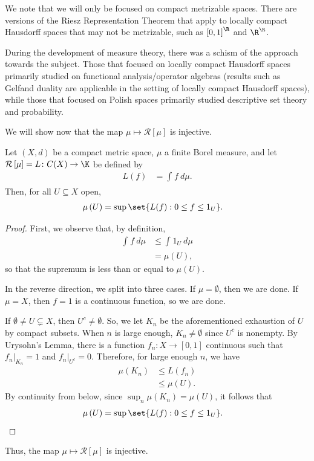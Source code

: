 \documentclass[10pt]{mypackage}
\begin{document}
We note that we will only be focused on compact metrizable spaces. There are versions of the Riesz Representation Theorem that apply to locally compact Hausdorff spaces that may not be metrizable, such as $\left[ 0,1 \right]^{\R}$ and $\R^{\R}$.
\begin{remark}
 During the development of measure theory, there was a schism of the approach towards the subject. Those that focused on locally compact Hausdorff spaces primarily studied on functional analysis/operator algebras (results such as Gelfand duality are applicable in the setting of locally compact Hausdorff spaces), while those that focused on Polish spaces primarily studied descriptive set theory and probability.
\end{remark}
We will show now that the map $\mu\mapsto \mathcal{R}\left[ \mu \right]$ is injective.
\begin{proposition}
  Let $\left( X,d \right)$ be a compact metric space, $\mu$ a finite Borel measure, and let $\mathcal{R}\left[ \mu \right] = L\colon C(X)\to \K$ be defined by
  \begin{align*}
    L(f) &= \int_{}^{} f\:d\mu.
  \end{align*}
  Then, for all $U\subseteq X$ open, 
  \begin{align*}
    \mu\left( U \right) &= \sup\set{L(f) : 0\leq f \leq 1_{U}}.
  \end{align*}
\end{proposition}
\begin{proof}
  First, we observe that, by definition,
  \begin{align*}
    \int_{}^{} f\:d\mu &\leq \int_{}^{} 1_{U}\:d\mu\\
                       &= \mu\left( U \right),
  \end{align*}
  so that the supremum is less than or equal to $\mu\left( U \right)$.

  In the reverse direction, we split into three cases. If $\mu = \emptyset$, then we are done. If $\mu = X$, then $f = 1$ is a continuous function, so we are done.

  If $\emptyset\neq U\subsetneq X$, then $U^{c}\neq \emptyset$. So, we let $K_n$ be the aforementioned exhaustion of $U$ by compact subsets. When $n$ is large enough, $K_n\neq \emptyset$ since $U^{c}$ is nonempty. By Urysohn's Lemma, there is a function $f_n\colon X\to [0,1]$ continuous such that $f_n|_{K_n} = 1$ and $f_n|_{U^{c}} = 0$. Therefore, for large enough $n$, we have
  \begin{align*}
    \mu\left( K_n \right) &\leq L\left( f_n \right)\\
                          &\leq \mu\left( U \right).
  \end{align*}
  By continuity from below, since $\sup_{n}\mu\left( K_n \right) = \mu\left( U \right)$, it follows that
  \begin{align*}
    \mu\left( U \right) &= \sup\set{L(f) : 0\leq f \leq 1_U}.
  \end{align*}
\end{proof}
Thus, the map $\mu\mapsto \mathcal{R}\left[ \mu \right]$ is injective.
\end{document}
